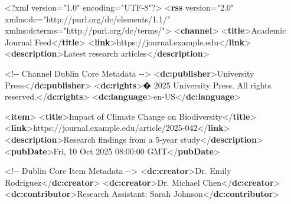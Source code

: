 \documentclass[
  letterpaper,
  DIV=11,
  numbers=noendperiod]{scrartcl}
\newenvironment{Shaded}{\begin{snugshade}}{\end{snugshade}}
\newcommand{\CommentTok}[1]{\textcolor[rgb]{0.37,0.37,0.37}{#1}}
\newcommand{\FunctionTok}[1]{\textcolor[rgb]{0.28,0.35,0.67}{#1}}
\newcommand{\KeywordTok}[1]{\textcolor[rgb]{0.00,0.23,0.31}{\textbf{#1}}}
\newcommand{\NormalTok}[1]{\textcolor[rgb]{0.00,0.23,0.31}{#1}}
\newcommand{\OtherTok}[1]{\textcolor[rgb]{0.00,0.23,0.31}{#1}}
\newcommand{\StringTok}[1]{\textcolor[rgb]{0.13,0.47,0.30}{#1}}
\begin{document}
\begin{Shaded}
\begin{Highlighting}[]
\FunctionTok{\textless{}?xml}\OtherTok{ version=}\StringTok{"1.0"}\OtherTok{ encoding=}\StringTok{"UTF{-}8"}\FunctionTok{?\textgreater{}}
\NormalTok{\textless{}}\KeywordTok{rss}\OtherTok{ version=}\StringTok{"2.0"} 
\OtherTok{     xmlns:dc=}\StringTok{"http://purl.org/dc/elements/1.1/"}
\OtherTok{     xmlns:dcterms=}\StringTok{"http://purl.org/dc/terms/"}\NormalTok{\textgreater{}}
\NormalTok{  \textless{}}\KeywordTok{channel}\NormalTok{\textgreater{}}
\NormalTok{    \textless{}}\KeywordTok{title}\NormalTok{\textgreater{}Academic Journal Feed\textless{}/}\KeywordTok{title}\NormalTok{\textgreater{}}
\NormalTok{ \textless{}}\KeywordTok{link}\NormalTok{\textgreater{}https://journal.example.edu\textless{}/}\KeywordTok{link}\NormalTok{\textgreater{}}
\NormalTok{    \textless{}}\KeywordTok{description}\NormalTok{\textgreater{}Latest research articles\textless{}/}\KeywordTok{description}\NormalTok{\textgreater{}}
    
    \CommentTok{\textless{}!{-}{-} Channel Dublin Core Metadata {-}{-}\textgreater{}}
\NormalTok{    \textless{}}\KeywordTok{dc:publisher}\NormalTok{\textgreater{}University Press\textless{}/}\KeywordTok{dc:publisher}\NormalTok{\textgreater{}}
\NormalTok{    \textless{}}\KeywordTok{dc:rights}\NormalTok{\textgreater{}� 2025 University Press. All rights reserved.\textless{}/}\KeywordTok{dc:rights}\NormalTok{\textgreater{}}
\NormalTok{    \textless{}}\KeywordTok{dc:language}\NormalTok{\textgreater{}en{-}US\textless{}/}\KeywordTok{dc:language}\NormalTok{\textgreater{}}
    
\NormalTok{    \textless{}}\KeywordTok{item}\NormalTok{\textgreater{}}
\NormalTok{\textless{}}\KeywordTok{title}\NormalTok{\textgreater{}Impact of Climate Change on Biodiversity\textless{}/}\KeywordTok{title}\NormalTok{\textgreater{}}
\NormalTok{      \textless{}}\KeywordTok{link}\NormalTok{\textgreater{}https://journal.example.edu/article/2025{-}042\textless{}/}\KeywordTok{link}\NormalTok{\textgreater{}}
\NormalTok{  \textless{}}\KeywordTok{description}\NormalTok{\textgreater{}Research findings from a 5{-}year study\textless{}/}\KeywordTok{description}\NormalTok{\textgreater{}}
\NormalTok{      \textless{}}\KeywordTok{pubDate}\NormalTok{\textgreater{}Fri, 10 Oct 2025 08:00:00 GMT\textless{}/}\KeywordTok{pubDate}\NormalTok{\textgreater{}}

      \CommentTok{\textless{}!{-}{-} Dublin Core Item Metadata {-}{-}\textgreater{}}
\NormalTok{      \textless{}}\KeywordTok{dc:creator}\NormalTok{\textgreater{}Dr. Emily Rodriguez\textless{}/}\KeywordTok{dc:creator}\NormalTok{\textgreater{}}
\NormalTok{    \textless{}}\KeywordTok{dc:creator}\NormalTok{\textgreater{}Dr. Michael Chen\textless{}/}\KeywordTok{dc:creator}\NormalTok{\textgreater{}}
\NormalTok{      \textless{}}\KeywordTok{dc:contributor}\NormalTok{\textgreater{}Research Assistant: Sarah Johnson\textless{}/}\KeywordTok{dc:contributor}\NormalTok{\textgreater{}}
      

\end{Highlighting}
\end{Shaded}
\end{document}
